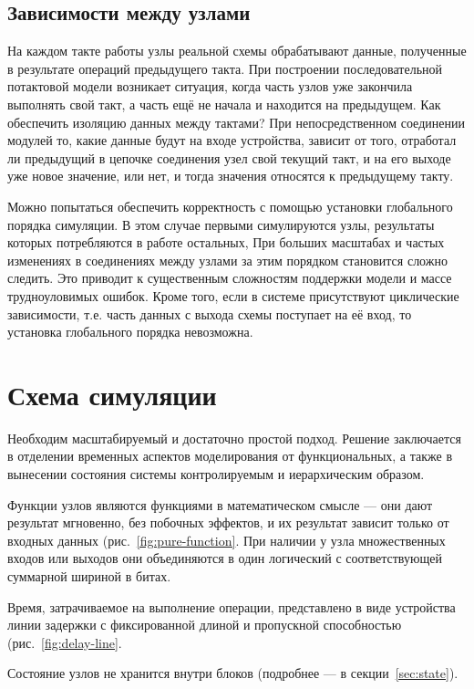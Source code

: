 \subsection{Зависимости между узлами}

На каждом такте работы узлы реальной схемы обрабатывают данные, полученные в результате операций предыдущего такта. При построении последовательной потактовой модели возникает ситуация, когда часть узлов уже закончила выполнять свой такт, а часть ещё не начала и находится на предыдущем. Как обеспечить изоляцию данных между тактами? При непосредственном соединении модулей то, какие данные будут на входе устройства, зависит от того, отработал ли предыдущий в цепочке соединения узел свой текущий такт, и на его выходе уже новое значение, или нет, и тогда значения относятся к предыдущему такту. 

Можно попытаться обеспечить корректность с помощью установки глобального порядка симуляции. В этом случае первыми симулируются узлы, результаты которых потребляются в работе остальных, При больших масштабах и частых изменениях в соединениях между узлами за этим порядком становится сложно следить. Это приводит к существенным сложностям поддержки модели и массе трудноуловимых ошибок. Кроме того, если в системе присутствуют циклические зависимости, т.е. часть данных с выхода схемы поступает на её вход, то установка глобального порядка невозможна.

\section{Схема симуляции}

Необходим масштабируемый и достаточно простой подход. Решение заключается в отделении временных аспектов моделирования от функциональных, а также в вынесении состояния системы контролируемым и иерархическим образом. 

\begin{itemize*}
    \item Функции узлов являются функциями в математическом смысле --- они дают результат мгновенно, без побочных эффектов, и их результат зависит только от входных данных (рис.~\ref{fig:pure-function}. При наличии у узла множественных входов или выходов они объединяются в один логический с соответствующей суммарной шириной в битах. 
    \item Время, затрачиваемое на выполнение операции, представлено в виде устройства линии задержки с фиксированной длиной и пропускной способностью (рис.~\ref{fig:delay-line}.
    \item Состояние узлов не хранится внутри блоков (подробнее --- в секции~\ref{sec:state}).
\end{itemize*}

